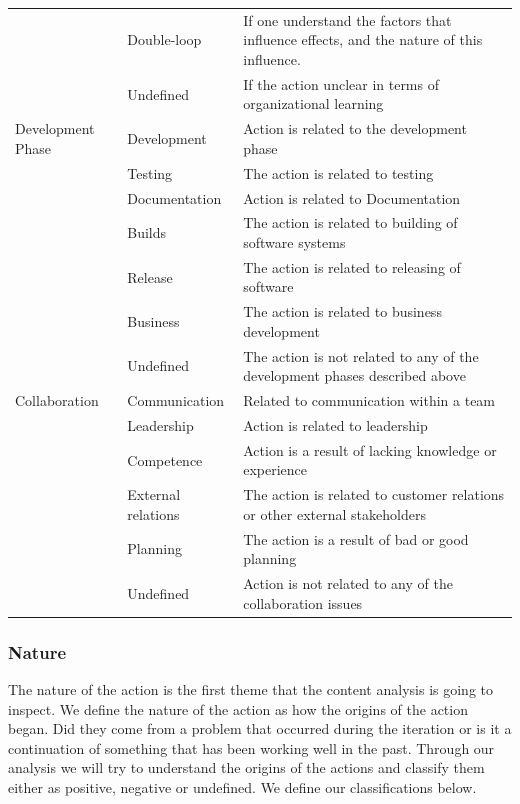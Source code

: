 \begin{table}[h]
\begin{center}
\begin{adjustbox}{width=\textwidth, totalheight=0.9\textheight, keepaspectratio}
\begin{tabular}{| l | l | p{} |}
			& Double-loop & If one understand the factors that influence effects, and the nature of this influence. \\ \cline{2-3}
			& Undefined & If the action unclear in terms of organizational learning \\ \hline
			Development Phase & Development & Action is related to the development phase \\ \cline{2-3}
			& Testing & The action is related to testing \\ \cline{2-3}
			& Documentation & Action is related to Documentation \\ \cline{2-3}
			& Builds & The action is related to building of software systems \\ \cline{2-3}
			& Release & The action is related to releasing of software \\ \cline{2-3}
			& Business & The action is related to business development \\ \cline{2-3}
			& Undefined & The action is not related to any of the development phases described above \\ 
			\hline
			Collaboration & Communication & Related to communication within a team \\ \cline{2-3}
			& Leadership & Action is related to leadership \\ \cline{2-3}
			& Competence & Action is a result of lacking knowledge or experience \\ \cline{2-3}
			& External relations & The action is related to customer relations or other external stakeholders \\ \cline{2-3}
			& Planning & The action is a result of bad or good planning \\ \cline{2-3}
			& Undefined & Action is not related to any of the collaboration issues \\
			\hline
			\end{tabular}
		\end{adjustbox}
	\end{center}
\end{table}
\afterpage{\clearpage}

\subsubsection{Nature}
The nature of the action is the first theme that the content analysis is going to inspect. We define the nature of the action as how the origins of the action began. Did they come from a problem that occurred during the iteration or is it a continuation of something that has been working well in the past. Through our analysis we will try to understand the origins of the actions and classify them either as positive, negative or undefined. We define our classifications below. 
